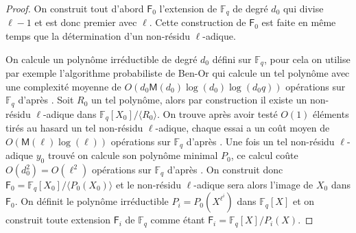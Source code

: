 \documentclass[10pt,a4paper]{book}
\theoremstyle{plain}
\theoremstyle{definition}
\theoremstyle{definition}
\theoremstyle{definition}
\theoremstyle{definition}
\theoremstyle{remark}
\newtheorem{rem}[thm]{Remarque}
\theoremstyle{remark}
\theoremstyle{definition}
\begin{document}
 \begin{proof}
  On construit tout d'abord $\mathsf{F}_0$ l'extension de $\mathbb{F}_q$ de degré $d_0$ qui divise $\ell-1$ et est donc premier avec $\ell$. Cette construction de $\mathsf{F}_0$ est faite en même temps que la détermination d'un non-résidu $\ell$-adique. 

On calcule un polynôme irréductible de degré $d_0$ défini sur $\mathbb{F}_q$, pour cela on utilise par exemple l'algorithme probabiliste de Ben-Or qui calcule un tel polynôme avec une complexité moyenne de $O(d_0\mathsf{M}(d_0)\log(d_0)\log(d_0q))$ opérations sur $\mathbb{F}_q$ d'après \cite[Theorem 14.42]{vzGJG03}.
 Soit $R_0$ un tel polynôme, alors par construction il existe un non-résidu $\ell$-adique dans $\mathbb{F}_q[X_0]/ \langle R_0 \rangle $. On trouve après avoir testé $O(1)$ éléments tirés au hasard un tel non-résidu $\ell$-adique, chaque essai a un coût moyen de $O(\mathsf{M}(\ell)\log(\ell))$ opérations sur $\mathbb{F}_q$ d'après \cite[11.1]{vzGJG03}. Une fois un tel non-résidu $\ell$-adique $y_0$ trouvé on calcule son polynôme minimal $P_0$, ce calcul coûte $O(d_0^2)=O(\ell^2)$ opérations sur $\mathbb{F}_q$ d'après \cite[Th. 3.4]{Shoup93}. On construit donc $\mathsf{F}_0=\mathbb{F}_q[X_0]/\langle P_0(X_0) \rangle$ et le non-résidu $\ell$-adique sera alors l'image de $X_0$ dans $\mathsf{F}_0$. On définit le polynôme irréductible $P_i=P_0(X^{\ell^{i}})$ dans $\mathbb{F}_q[X]$ et on construit toute extension $\mathsf{F}_{i}$ de $\mathbb{F}_{q}$ comme étant $\mathsf{F}_{i}=\mathbb{F}_q[X]/P_i(X)$. 
 
\end{proof}

\end{document}
